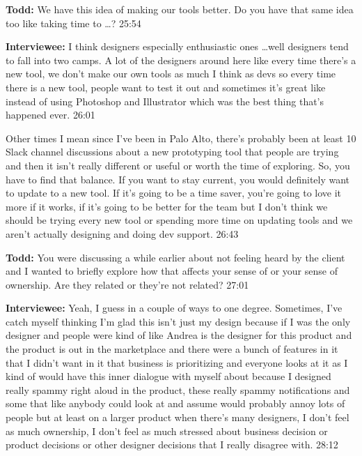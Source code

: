 \textbf{Todd:} We have this idea of making our tools better.  Do you have that same idea too like taking time to \ldots? 25:54

\textbf{Interviewee:} I think designers especially enthusiastic ones \ldots well designers tend to fall into two camps.  A lot of the designers around here like every time there's a new tool, we don't make our own tools as much I think as devs so every time there is a new tool, people want to test it out and sometimes it's great like  instead of using Photoshop and Illustrator which was the best thing that's happened ever.  26:01

Other times I mean since I've been in Palo Alto, there's probably been at least 10 Slack channel discussions about a new prototyping tool that people are trying and then it isn't really different or useful or worth the time of exploring.  So, you have to find that balance.  If you want to stay current, you would definitely want to update to a new tool.  If it's going to be a time saver, you're going to love it more if it works, if it's going to be better for the team but I don't think we should be trying every new tool or spending more time on updating tools and we aren't actually designing and doing dev support.  26:43

\textbf{Todd:} You were discussing a while earlier about not feeling heard by the client and I wanted to briefly explore how that affects your sense of  or your sense of ownership.  Are they related or they're not related?  27:01

\textbf{Interviewee:} Yeah, I guess in a couple of ways to one degree.  Sometimes, I've catch myself thinking I'm glad this isn't just my design because if I was the only designer and people were kind of like Andrea is the designer for this product and the product is out in the marketplace and there were a bunch of features in it that I didn't want in it that business is prioritizing and everyone looks at it as   I kind of would have this inner dialogue with myself about  because I designed really spammy right aloud in the product, these really spammy notifications and some that like anybody could look at and assume would probably annoy lots of people but at least on a larger product when there's many designers, I don't feel as much ownership, I don't feel as much stressed about business decision or product decisions or other designer decisions that I really disagree with.  28:12

